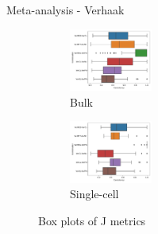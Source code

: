 \documentclass[aspectratio=169,9pt]{beamer}
\begin{document}
    \begin{frame}{Meta-analysis - Verhaak}
        \begin{adjustwidth}{-5cm}{-5cm}
            \centering
            \begin{figure}\ContinuedFloat
                \centering
                \begin{subfigure}[c]{\textwidth}
                    \centering
                    \includegraphics[width=0.3\textwidth]{boxplot_Bulk_Ver_maxnorm}
                    \caption{Bulk}
                \end{subfigure}
                \begin{subfigure}[c]{\textwidth}
                    \centering
                    \includegraphics[width=0.3\textwidth]{boxplot_SC_Ver_maxnorm}
                    \caption{Single-cell}
                \end{subfigure}
                \caption{Box plots of J metrics}
            \end{figure}
        \end{adjustwidth}
    \end{frame}
\end{document}
